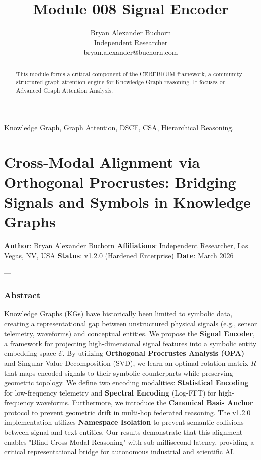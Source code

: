\documentclass[10pt,journal,compsoc]{IEEEtran}
\begin{document}
\title{Module 008 Signal Encoder}
\author{Bryan Alexander Buchorn \\ Independent Researcher \\ bryan.alexander@buchorn.com}

\maketitle

\begin{abstract}
This module forms a critical component of the CEREBRUM framework, a community-structured graph attention engine for Knowledge Graph reasoning. It focuses on Advanced Graph Attention Analysis.
\end{abstract}

\begin{IEEEkeywords}
Knowledge Graph, Graph Attention, DSCF, CSA, Hierarchical Reasoning.
\end{IEEEkeywords}

\section{Cross-Modal Alignment via Orthogonal Procrustes: Bridging Signals and Symbols in Knowledge Graphs}

\textbf{Author}: Bryan Alexander Buchorn  
\textbf{Affili\-ations}: Independent Researcher, Las Vegas, NV, USA  
\textbf{Status}: v1.2.0 (Hardened Enterprise)  
\textbf{Date}: March 2026

---

\subsubsection{Abstract}
Knowledge Graphs (KGs) have histo\-rically been limited to symbolic data, creating a repre\-sentational gap between unstr\-uctured physical signals (e.g., sensor telemetry, waveforms) and conceptual entities. We propose the \textbf{Signal Encoder}, a framework for projecting high-dimensional signal features into a symbolic entity embedding space $\mathcal{E}$. By utilizing \textbf{Orthogonal Procrustes Analysis (OPA)} \cite{schonemann1966procrustes, gower2004procrustes} and Singular Value Decomp\-osition (SVD), we learn an optimal rotation matrix $R$ that maps encoded signals to their symbolic count\-erparts while preserving geometric topology. We define two encoding modalities: \textbf{Statistical Encoding} for low-frequency telemetry and \textbf{Spectral Encoding} (Log-FFT) for high-frequency waveforms. Furthermore, we introduce the \textbf{Canonical Basis Anchor} protocol to prevent geometric drift in multi-hop federated reasoning. The v1.2.0 imple\-mentation utilizes \textbf{Namespace Isolation} to prevent semantic collisions between signal and text entities. Our results demonstrate that this alignment enables "Blind Cross-Modal Reasoning" with sub-millisecond latency, providing a critical repre\-sentational bridge for autonomous industrial and scientific AI.
\end{document}
